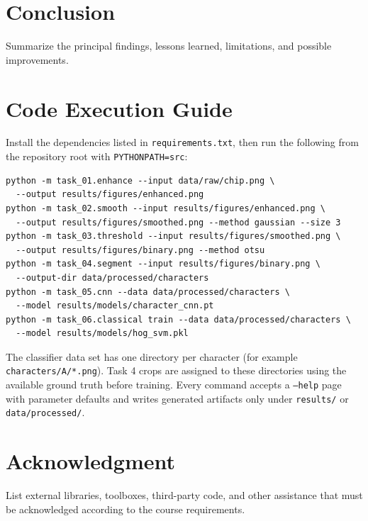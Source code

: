 \documentclass[conference]{IEEEtran}
\begin{document}
\section{Conclusion}
Summarize the principal findings, lessons learned, limitations, and possible
improvements.

\section*{Code Execution Guide}
Install the dependencies listed in \texttt{requirements.txt}, then run the
following from the repository root with \texttt{PYTHONPATH=src}:

\begingroup
\scriptsize
\begin{verbatim}
python -m task_01.enhance --input data/raw/chip.png \
  --output results/figures/enhanced.png
python -m task_02.smooth --input results/figures/enhanced.png \
  --output results/figures/smoothed.png --method gaussian --size 3
python -m task_03.threshold --input results/figures/smoothed.png \
  --output results/figures/binary.png --method otsu
python -m task_04.segment --input results/figures/binary.png \
  --output-dir data/processed/characters
python -m task_05.cnn --data data/processed/characters \
  --model results/models/character_cnn.pt
python -m task_06.classical train --data data/processed/characters \
  --model results/models/hog_svm.pkl
\end{verbatim}
\endgroup

The classifier data set has one directory per character (for example
\texttt{characters/A/*.png}). Task 4 crops are assigned to these directories
using the available ground truth before training. Every command accepts a
\texttt{--help} page with parameter defaults and writes generated artifacts only
under \texttt{results/} or \texttt{data/processed/}.

\section*{Acknowledgment}
List external libraries, toolboxes, third-party code, and other assistance that
must be acknowledged according to the course requirements.



\end{document}
